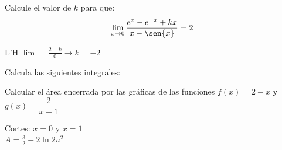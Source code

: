 \documentclass[addpoints,spanish, 12pt,a4paper]{exam}
\begin{document}
\begin{questions}

\question[2] Calcule el valor de $k$ para que: $$\lim_{x \to 0}\dfrac{e^x-e^{-x}+kx}{x-\sen{x}}=2$$
\begin{solution}
    L'H $\lim =\frac{2+k}{0}  \to k = -2$
\end{solution}
\addpoints

\question Calcula las siguientes integrales:


\question[2] Calcular el área encerrada por las gráficas de las funciones $f(x)=2-x$ y $g(x)=\dfrac{2}{x-1}$
\begin{solution}
    Cortes: $x=0$ y $x=1$ \\
    $A=\frac{3}{2}-2\ln{2} u^2$
\end{solution}


\end{questions}
\end{document}
